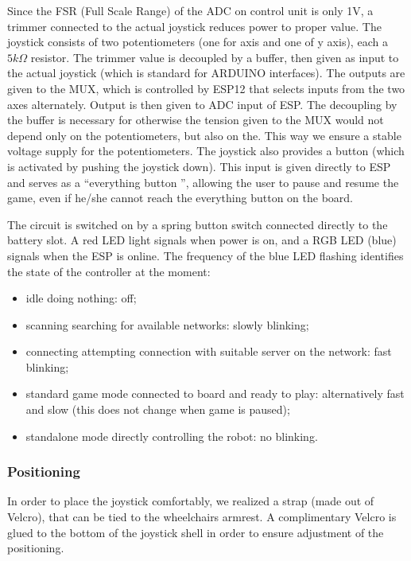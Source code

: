 \documentclass[a4paper,twoside]{book}
\begin{document}
Since the FSR (Full Scale Range) of the ADC on control unit is only 1V, a trimmer connected to the actual joystick reduces power to proper value. The joystick consists of two potentiometers (one for axis and one of y axis), each a $5k\Omega$ resistor.
The trimmer value is decoupled by a buffer, then given as input to the actual joystick (which is standard for ARDUINO interfaces). The outputs are given to the MUX, which is controlled by ESP12 that selects inputs from the two axes alternately. Output is then given to ADC input of ESP. The decoupling by the buffer is necessary for otherwise the tension given to the MUX would not depend only on the potentiometers, but also on the. This way we ensure a stable voltage supply for the potentiometers. 
The joystick also provides a button (which is activated by pushing the joystick down). This input is given directly to ESP and serves as a \textquotedblleft everything button \textquotedblright, allowing the user to pause and resume the game, even if he/she cannot reach the everything button on the board.

The circuit is switched on by a spring button switch connected directly to the battery slot. A red LED light signals when power is on, and a RGB LED (blue) signals when the ESP is online. The frequency of the blue LED flashing identifies the state of the controller at the moment:
\begin{itemize}
\item idle \textemdash doing nothing: off;
\item scanning \textemdash searching for available networks: slowly blinking;
\item connecting \textemdash attempting connection with suitable server on the network: fast blinking;
\item standard game mode \textemdash connected to board and ready to play: alternatively fast and slow (this does not change when game is paused);
\item standalone mode \textemdash directly controlling the robot: no blinking.
\end{itemize}


\subsubsection{Positioning}

In order to place the joystick comfortably, we realized a strap (made out of Velcro), that can be tied to the wheelchairs armrest. A complimentary Velcro is glued to the bottom of the joystick shell in order to ensure adjustment of the positioning. 
\end{document}
